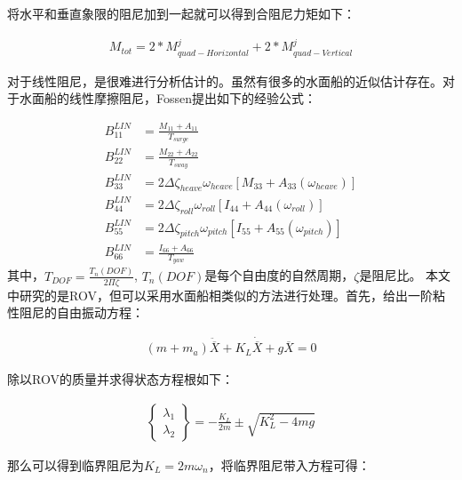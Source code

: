将水平和垂直象限的阻尼加到一起就可以得到合阻尼力矩如下：

\begin{equation}
\begin{aligned}
M_{tot} = 2 \ast M_{quad-Horizontal}^{j}  + 2 \ast M_{quad-Vertical}^{j}
\end{aligned}
\end{equation}

对于线性阻尼，是很难进行分析估计的。虽然有很多的水面船的近似估计存在。对于水面船的线性摩擦阻尼，Fossen提出如下的经验公式：

\begin{equation}
\begin{aligned}
B_{11}^{LIN} &= \frac{M_{11} + A_{11}}{T_{surge}} \\
B_{22}^{LIN} &= \frac{M_{22} + A_{22}}{T_{sway}} \\
B_{33}^{LIN} &= 2 \Delta \zeta_{heave} \omega_{heave} [M_{33} + A_{33}(\omega_{heave})]\\
B_{44}^{LIN} &= 2 \Delta \zeta_{roll} \omega_{roll} [I_{44} + A_{44}(\omega_{roll})]\\
B_{55}^{LIN} &= 2 \Delta \zeta_{pitch} \omega_{pitch} [I_{55} + A_{55}(\omega_{pitch})]\\
B_{66}^{LIN} &= \frac{I_{66}+A_{66}}{T_{yaw}}
\end{aligned}
\end{equation}
其中，$T_{DOF} = \frac{T_n(DOF)}{2\Pi \zeta}$, $T_n(DOF)$是每个自由度的自然周期，$\zeta$是阻尼比。
本文中研究的是ROV，但可以采用水面船相类似的方法进行处理。首先，给出一阶粘性阻尼的自由振动方程：

\begin{equation}
\begin{aligned}
(m+m_a)\ddot{\overline{X}} + K_L \dot{\overline{X}} + g \overline{X} = 0
\end{aligned}
\end{equation}

除以ROV的质量并求得状态方程根如下：

\begin{equation}
\begin{aligned}
\left \{ \begin{matrix}
\lambda _1 \\
\lambda _2
\end{matrix} \right \}
=  - \frac{K_L}{2m}\pm \sqrt{K_L^2 - 4mg}
\end{aligned}
\end{equation}

那么可以得到临界阻尼为$K_{L} = 2m\omega_n$，将临界阻尼带入方程可得：

